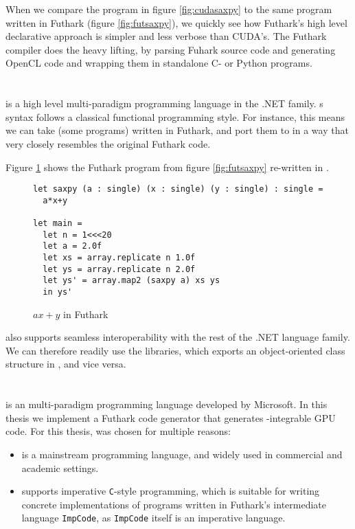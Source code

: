 When we compare the program in figure \ref{fig:cudasaxpy} to the same program
written in Futhark (figure \ref{fig:futsaxpy}), we quickly see how Futhark's
high level declarative approach is simpler and less verbose than CUDA's.
The Futhark compiler does the heavy lifting, by parsing Fuhark source code and
generating OpenCL code and wrapping them in standalone C- or Python programs.

\section{\fsharp{}}
\fsharp{} is a high level multi-paradigm programming language in the .NET family.
\fsharp{}s syntax follows a classical functional programming style. For
instance, this means we can take (some programs) written in Futhark, and port
them to \fsharp{} in a way that very closely resembles the original Futhark
code.

Figure \ref{fig:fsharpsaxpy} shows the Futhark program from
figure \ref{fig:futsaxpy} re-written in \fsharp{}.

\begin{figure}[H]
  \centering
\begin{verbatim}
let saxpy (a : single) (x : single) (y : single) : single =
  a*x+y
  
let main =
  let n = 1<<<20
  let a = 2.0f
  let xs = array.replicate n 1.0f
  let ys = array.replicate n 2.0f
  let ys' = array.map2 (saxpy a) xs ys
  in ys'
  \end{verbatim}
  \caption{$ax+y$ in Futhark}
  \label{fig:fsharpsaxpy}
\end{figure}

\fsharp{} also supports seamless interoperability with the rest of the .NET 
language family. We can therefore readily use the \csharp{} libraries, which
exports an object-oriented class structure in \fsharp{}, and vice versa.

\section*{\csharp{}}
\csharp{} is an multi-paradigm programming language developed by Microsoft.
In this thesis we implement a Futhark code generator that generates
\csharp{}-integrable GPU code. For this thesis, \csharp{} was chosen for
multiple reasons:
\begin{itemize}
\item \csharp{} is a mainstream programming language, and widely used in
  commercial and academic settings.

\item \csharp{} supports imperative \texttt{C}-style programming, which is
  suitable for writing concrete implementations of programs written in Futhark's
  intermediate language \texttt{ImpCode}, as \texttt{ImpCode}
  itself is an imperative language.
\end{itemize}

